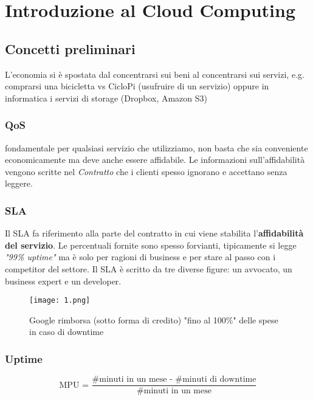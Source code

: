 \section{Introduzione al Cloud Computing}
\subsection{Concetti preliminari}
\begin{definition}
L'economia si è spostata dal concentrarsi sui beni al concentrarsi sui servizi, e.g. comprarsi una bicicletta vs CicloPi (usufruire di un servizio) oppure in informatica i servizi di storage (Dropbox, Amazon S3)
\end{definition}

\subsubsection{QoS}
\begin{definition}
fondamentale per qualsiasi servizio che utilizziamo, non basta che sia conveniente economicamente ma deve anche essere affidabile. Le informazioni sull’affidabilità vengono scritte nel \textit{Contratto} che i clienti spesso ignorano e accettano senza leggere.
\end{definition}

\subsubsection{SLA}
\begin{definition}
Il SLA fa riferimento alla parte del contratto in cui viene stabilita l'\textbf{affidabilità del servizio}. Le percentuali fornite sono spesso forvianti, tipicamente si legge \textit{"99\% uptime"} ma è solo per ragioni di business e per stare al passo con i competitor del settore.
Il SLA è scritto da tre diverse figure: un avvocato, un business expert e un developer.
\end{definition}

\begin{figure}[h!]
    \centering
	\texttt{[image: 1.png]}
    \caption{Google rimborsa (sotto forma di credito) "fino al 100\%" delle spese in caso di downtime}
\end{figure}

\subsubsection{Uptime}
\begin{definition}
    $$\text{MPU = } \frac{\text{\# minuti in un mese - \# minuti di downtime}}{\text{\# minuti in un mese}}$$
\end{definition}

